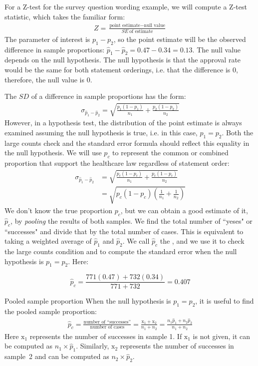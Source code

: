 For a Z-test for the survey question wording example, we will compute a Z-test statistic, which takes the familiar form:
\begin{align*}
Z = \frac{\text{point estimate} - \text{null value}}{SE\ \text{of estimate}}
\end{align*}
The parameter of interest is $p_1-p_2$, so the point estimate will be the observed difference in sample proportions:  $\hat{p}_{1} - \hat{p}_{2} = 0.47 - 0.34 = 0.13$.  The null value depends on the null hypothesis.  The null hypothesis is that the approval rate would be the same for both statement orderings, i.e. that the difference is 0, therefore, the null value is 0. 

The $SD$ of a difference in sample proportions has the form:
\begin{align*}
\sigma_{\hat{p}_1-\hat{p}_2} = \sqrt{\frac{p_1(1-p_1)}{n_1} + \frac{p_2(1-p_2)}{n_2}}
\end{align*}
However, in a hypothesis test, the distribution of the point estimate is always examined assuming the null hypothesis is true, i.e. in this case, $p_1 = p_2$. Both the large counts check and the standard error formula should reflect this equality in the null hypothesis. We will use $p_c$ to represent the common or combined proportion that support the healthcare law regardless of statement order:
\begin{align*}
\sigma_{\hat{p}_1-\hat{p}_2} &= \sqrt{\frac{p_c(1-p_c)}{n_1} + \frac{p_c(1-p_c)}{n_2}} \\
	&= \sqrt{p_c(1-p_c)\left(\frac{1}{n_1} + \frac{1}{n_2} \right)}
\end{align*}
We don't know the true proportion $p_c$, but we can obtain a good estimate of it, $\hat{p}_c$, by \emph{pooling} the results of both samples.  We find the total number of ``yeses" or ``successes" and divide that by the total number of cases.  This is equivalent to taking a weighted average of $\hat{p}_1$ and $\hat{p}_2$.  We call $\hat{p}_c$ the , and we use it to check the large counts condition and to compute the standard error when the null hypothesis is $p_1 = p_2$.  Here:

$$\hat{p}_c =  \frac{771(0.47) + 732(0.34)}{771+732}= 0.407$$

\begin{onebox}{Pooled sample proportion}
When the null hypothesis is $p_1 = p_2$, it is useful to find the pooled sample proportion:
\begin{eqnarray*}
\hat{p}_c = \frac{\text{number of ``successes''}}{\text{number of cases}} = \frac{\text{x}_1+\text{x}_2}{n_1+n_2}=\frac{n_1\hat{p}_1 + n_2\hat{p}_2}{n_1 + n_2}
\end{eqnarray*}
Here $\text{x}_1$ represents the number of successes in sample 1. If $\text{x}_1$ is not given, it can be computed as $n_1\times \hat{p}_1$. Similarly, $\text{x}_2$ represents the number of successes in sample~2 and can be computed as $n_2\times \hat{p}_2$.
\end{onebox}


